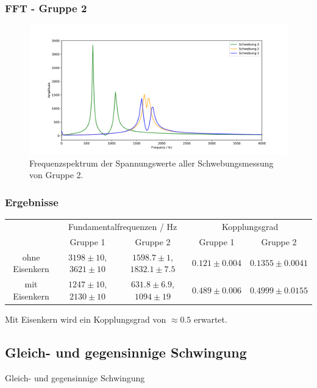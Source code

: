 \documentclass{beamer}
\begin{document}
\begin{frame}
\frametitle{FFT - Gruppe 2}
\begin{figure}
\includegraphics[width = \framewidth]{abbildungen/plotsLC/FFT_schwebungen.pdf}
\caption{Frequenzspektrum der Spannungswerte aller Schwebungsmessung von Gruppe 2.}
\end{figure}
\end{frame}

\begin{frame}
\frametitle{Ergebnisse}

\begin{table}
\begin{adjustbox}{width=\textwidth}
\begin{tabular}{|c|c|c|c|c|}
\hline
\multirow{2}{*}{\ } & \multicolumn{2}{c|}{Fundamentalfrequenzen / Hz} & \multicolumn{2}{c|}{Kopplungsgrad} \\
\cline{2-5}
 & Gruppe 1 & Gruppe 2 & Gruppe 1 & Gruppe 2 \\
\hline
ohne Eisenkern & $3198\pm10$, $3621\pm10$ & $1598.7 \pm 1$, $1832.1 \pm 7.5$ & $0.121\pm 0.004$ & $0.1355 \pm 0.0041$ \\
mit Eisenkern & $1247\pm10$, $2130\pm10$ & $631.8 \pm 6.9$, $1094 \pm 19$ & $0.489\pm 0.006$ & $0.4999 \pm 0.0155$ \\
\hline
\end{tabular}
\end{adjustbox}
\end{table}

Mit Eisenkern wird ein Kopplungsgrad von $\approx 0.5$ erwartet.
\end{frame}

\subsection{Gleich- und gegensinnige Schwingung}
\begin{frame}
\centering
\Large{Gleich- und gegensinnige Schwingung}
\end{frame}
\end{document}
